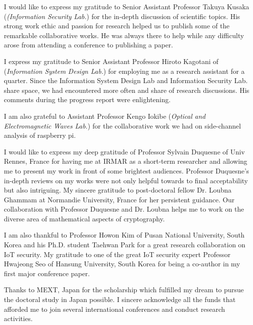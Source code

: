 \documentclass[a4paper]{article}
\begin{document}
\vspace{5pt}
I would like to express my gratitude to Senior Assistant Professor Takuya Kusaka (\textit{(Information Security Lab.}) for the in-depth discussion of scientific topics.
His strong work ethic and passion for research helped us to publish some of the remarkable collaborative works. 
He was always there to help while any difficulty arose from attending a conference to publishing a paper.  

\vspace{5pt}
I express my gratitude to Senior Assistant Professor Hiroto Kagotani of (\textit{Information System Design Lab.}) for employing me as a research assistant for a quarter. 
Since the Information System Design Lab and Information Security Lab. share space, we had encountered more often and share of research discussions.
His comments during the progress report were enlightening.

\vspace{5pt}
I am also grateful to Assistant Professor Kengo Iokibe (\textit{Optical and Electromagnetic Waves Lab.}) for the collaborative work we had on side-channel analysis of raspberry pi.

\vspace{5pt}
I would like to express my deep gratitude of Professor Sylvain Duquesne of  Univ  Rennes, France for having me at IRMAR as a short-term researcher and allowing me to present my work in front of some brightest audiences.
Professor Duquesne's in-depth reviews on my works were not only helpful towards to final acceptability but also intriguing.   
My sincere gratitude to post-doctoral fellow Dr. Loubna Ghammam at Normandie University, France for her persistent guidance.
Our collaboration with  Professor Duquesne and Dr. Loubna helps me to work on the diverse area of mathematical aspects of cryptography.

\vspace{5pt}
I am also thankful to Professor Howon Kim of Pusan National University, South Korea and his Ph.D. student Taehwan Park for  a great research collaboration on IoT security.
My gratitude to one of the great IoT security expert Professor Hwajeong Seo of Hansung University, South Korea for being a co-author in my first major conference paper.

\vspace{5pt}
Thanks to MEXT, Japan  for the scholarship which fulfilled my dream to pursue the  doctoral study in Japan possible.
I sincere acknowledge all the funds that afforded me to join several international conferences and conduct research activities.
\end{document}
